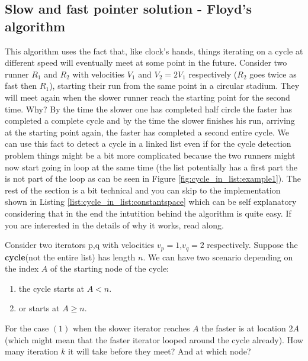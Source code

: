 



\subsection{Slow and fast pointer solution - Floyd’s algorithm }
\label{cycle_in_list:sec:slowfast}
This algorithm\cite{cit::wiki::floyd} uses the fact that, like clock's hands, things iterating on a cycle at different speed will eventually meet at some point in the future. Consider two runner $R_1$ and $R_2$ with velocities $V_1$ and $V_2=2V_1$ respectively ($R_2$ goes twice as fast then $R_1$), starting their run from the same point in a circular stadium. They will meet again when the slower runner reach the starting point for the second time. Why? By the time the slower one has completed half circle the faster has completed a complete cycle and by the time the slower finishes his run, arriving at the starting point again, the faster has completed a second entire cycle. We can use this fact to detect a cycle in a linked list even if for the cycle detection problem things might be a bit more complicated because the two runners might now start going in loop at the same time (the list potentially has a first part the is not part of the loop as can be seen in Figure \ref{fig:cycle_in_list:example1}).
The rest of the section is a bit technical and you can skip to the implementation shown in Listing \ref{list:cycle_in_list:constantspace} which can be self explanatory considering that in the end the intutition behind the algorithm is quite easy. If you are interested in the details of why it works, read along. 

Consider two iterators p,q with velocities $v_p=1$,$v_q=2$  respectively. Suppose the \textbf{cycle}(not the entire list) has length $n$. We can have two scenario depending on the index $A$ of the starting node of the cycle:

\begin{enumerate}
\item the cycle starts at $A < n$.
\item or  starts at \(A \geq n\).
\end{enumerate}

For the case $(1)$ when the slower iterator reaches $A$ the faster is at location $2A$ (which might mean that the faster iterator looped around the cycle already). How many iteration $k$ it will take before they meet? And at which node?

